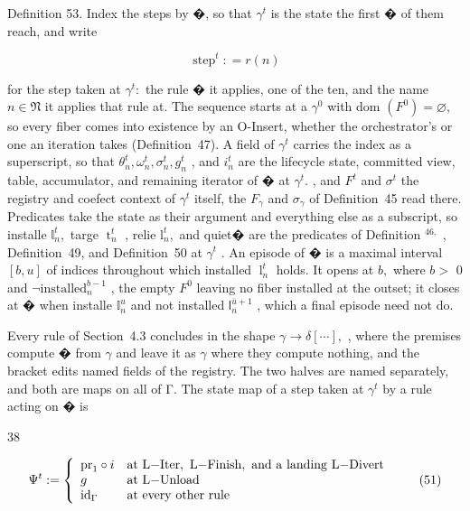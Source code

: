 \documentclass[
  10
]{article}
\begin{document}
Definition 53. Index the steps by �, so that \(\gamma ^ { t }\) is the
state the first � of them reach, and write

\[
\operatorname { s t e p } ^ { t } : = r ( n )\tag{50}
\]

for the step taken at \(\gamma ^ { t } \colon\) the rule � it applies,
one of the ten, and the name \(n \in \mathfrak { N }\) it applies that
rule at. The sequence starts at a \(\gamma ^ { 0 }\) with dom
\(\left( F ^ { 0 } \right) = \varnothing ,\) so every fiber comes into
existence by an O-Insert, whether the orchestrator's or one an iteration
takes (Definition~47). A field of \(\gamma ^ { t }\) carries the index
as a superscript, so that
\(\theta _ { n } ^ { t } , \omega _ { n } ^ { t } , \sigma _ { n } ^ { t } , g _ { n } ^ { t }\)
, and \(i _ { n } ^ { t }\) are the lifecycle state, committed view,
table, accumulator, and remaining iterator of � at \(\gamma ^ { t } .\)
, and \(F ^ { t }\) and \(\sigma ^ { t }\) the registry and coefect
context of \(\gamma ^ { t }\) itself, the \(F _ { \gamma }\) and
\(\sigma _ { \gamma }\) of Definition~45 read there. Predicates take the
state as their argument and everything else as a subscript, so installe
\(\mathbb { l } _ { n } ^ { t } ,\) targe
\(\operatorname { t } _ { n } ^ { t }\) , relie
\(\mathrm { l } _ { n } ^ { t } ,\) and quiet� are the predicates of
Definition \(^ { 4 6 , }\) , Definition~49, and Definition~50 at
\(\gamma ^ { t }\) . An episode of � is a maximal interval \([ b , u ]\)
of indices throughout which installed
\(\operatorname { l } _ { n } ^ { t }\) holds. It opens at \(b ,\) where
\(b >\) 0 and \(\neg \mathrm { i n s t a l l e d } _ { n } ^ { b - 1 }\)
, the empty \(F ^ { 0 }\) leaving no fiber installed at the outset; it
closes at � when installe \(\mathbb { I } _ { n } ^ { u }\) and not
installed \(\mathsf { l } _ { n } ^ { \bar { u } + 1 }\) , which a final
episode need not do.

Every rule of Section~4.3 concludes in the shape
\(\gamma \longrightarrow \delta [ \cdots ] ,\) , where the premises
compute � from \(\gamma\) and leave it as \(\gamma\) where they compute
nothing, and the bracket edits named fields of the registry. The two
halves are named separately, and both are maps on all of Γ. The state
map of a step taken at \(\gamma ^ { t }\) by a rule acting on � is

38

\[
\Psi ^ { t } : = \left\{ \begin{array} { l l } { \mathrm { p r } _ { 1 } \circ i } & { \mathrm { a t ~ L \mathrm { - } I t e r , ~ L \mathrm { - } F i n i s h , ~ a n d ~ a ~ l a n d i n g ~ L \mathrm { - } D i v e r t } } \\ { g } & { \mathrm { a t ~ L \mathrm { - } U n l o a d } } \\ { \mathrm { i d } _ { \Gamma } } & { \mathrm { a t ~ e v e r y ~ o t h e r ~ r u l e } } \end{array} \right.\tag{51}
\]
\end{document}
